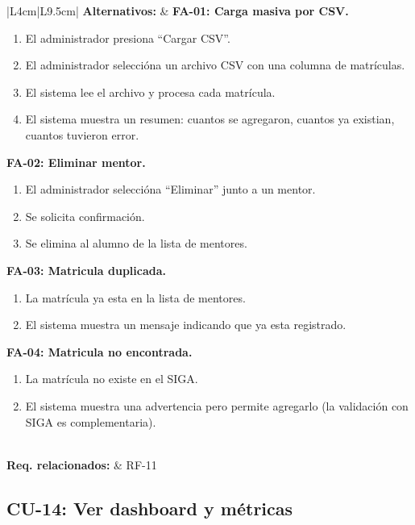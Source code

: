 \begin{longtable}{|L{4cm}|L{9.5cm}|}
    \textbf{Alternativos:} &
    \textbf{FA-01: Carga masiva por CSV.}
    \begin{enumerate}[nosep, leftmargin=*]
        \item[3.1] El administrador presiona ``Cargar CSV''.
        \item[3.2] El administrador seleccióna un archivo CSV con una columna de matrículas.
        \item[3.3] El sistema lee el archivo y procesa cada matrícula.
        \item[3.4] El sistema muestra un resumen: cuantos se agregaron, cuantos ya existian, cuantos tuvieron error.
    \end{enumerate}
    \vspace{0.2cm}
    \textbf{FA-02: Eliminar mentor.}
    \begin{enumerate}[nosep, leftmargin=*]
        \item[2.1] El administrador seleccióna ``Eliminar'' junto a un mentor.
        \item[2.2] Se solicita confirmación.
        \item[2.3] Se elimina al alumno de la lista de mentores.
    \end{enumerate}
    \vspace{0.2cm}
    \textbf{FA-03: Matricula duplicada.}
    \begin{enumerate}[nosep, leftmargin=*]
        \item[6.1] La matrícula ya esta en la lista de mentores.
        \item[6.2] El sistema muestra un mensaje indicando que ya esta registrado.
    \end{enumerate}
    \vspace{0.2cm}
    \textbf{FA-04: Matricula no encontrada.}
    \begin{enumerate}[nosep, leftmargin=*]
        \item[5.1] La matrícula no existe en el SIGA.
        \item[5.2] El sistema muestra una advertencia pero permite agregarlo (la validación con SIGA es complementaria).
    \end{enumerate} \\
    \hline
    \textbf{Req. relacionados:} & RF-11 \\
    \hline
\end{longtable}

\subsection{CU-14: Ver dashboard y métricas}

